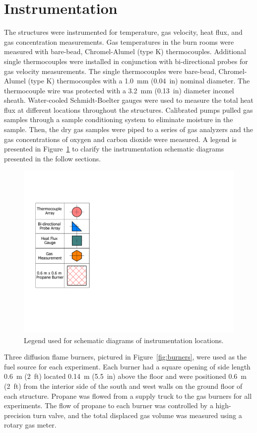\clearpage
\section{Instrumentation}
\label{sec:intrumentation}
The structures were instrumented for temperature, gas velocity, heat flux, and gas concentration measurements. Gas temperatures in the burn rooms were measured with bare-bead, Chromel-Alumel (type K) thermocouples. Additional single thermocouples were installed in conjunction with bi-directional probes for gas velocity measurements. The single thermocouples were bare-bead, Chromel-Alumel (type K) thermocouples with a 1.0~mm (0.04~in) nominal diameter. The thermocouple wire was protected with a 3.2~mm (0.13~in) diameter inconel sheath. Water-cooled Schmidt-Boelter gauges were used to measure the total heat flux at different locations throughout the structures. Calibrated pumps pulled gas samples through a sample conditioning system to eliminate moisture in the sample. Then, the dry gas samples were piped to a series of gas analyzers and the gas concentrations of oxygen and carbon dioxide were measured. A legend is presented in Figure~\ref{fig:Instrumentation_Legend} to clarify the instrumentation schematic diagrams presented in the follow sections.

\begin{figure}[!h]
	\centering
	\includegraphics[width=0.25\columnwidth]{Figures/Floor_Plans/Instrumentation_Legend}
	\caption[Instrumentation legend]{Legend used for schematic diagrams of instrumentation locations.}
	\label{fig:Instrumentation_Legend}
\end{figure}

Three diffusion flame burners, pictured in Figure~\ref{fig:burners}, were used as the fuel source for each experiment. Each burner had a square opening of side length 0.6~m (2~ft) located 0.14~m (5.5~in) above the floor and were positioned 0.6~m (2~ft) from the interior side of the south and west walls on the ground floor of each structure. Propane was flowed from a supply truck to the gas burners for all experiments. The flow of propane to each burner was controlled by a high-precision turn valve, and the total displaced gas volume was measured using a rotary gas meter.

